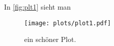 \documentclass{scrartcl}
\begin{document}
In \eqref{fig:plt1} sieht man
\begin{figure}
  \centering
  \texttt{[image: plots/plot1.pdf]}
  \caption{ein schöner Plot.}
  \label{fig:plt1}
\end{figure}
\end{document}
